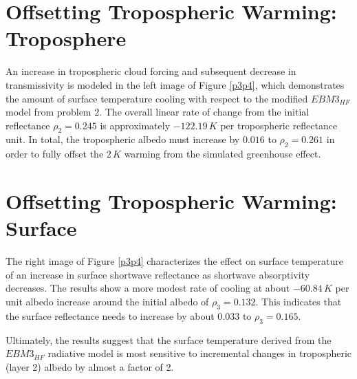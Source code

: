 \documentclass[12pt]{article}
\begin{document}
\section{Offsetting Tropospheric Warming: Troposphere}

An increase in tropospheric cloud forcing and subsequent decrease in transmissivity is modeled in the left image of Figure \ref{p3p4}, which demonstrates the amount of surface temperature cooling with respect to the modified $EBM3_{HF}$ model from problem 2. The overall linear rate of change from the initial reflectance $\rho_2=0.245$ is approximately $-122.19\,\si{K}$ per tropospheric reflectance unit. In total, the tropospheric albedo must increase by $0.016$ to $\rho_2 = 0.261$ in order to fully offset the $2\,\si{K}$ warming from the simulated greenhouse effect.

\section{Offsetting Tropospheric Warming: Surface}

The right image of Figure \ref{p3p4} characterizes the effect on surface temperature of an increase in surface shortwave reflectance as shortwave absorptivity decreases. The results show a more modest rate of cooling at about $-60.84\,\si{K}$ per unit albedo increase around the initial albedo of $\rho_3 = 0.132$. This indicates that the surface reflectance needs to increase by about $0.033$ to $\rho_3 = 0.165$.

Ultimately, the results suggest that the surface temperature derived from the $EBM3_{HF}$ radiative model is most sensitive to incremental changes in tropospheric (layer 2) albedo by almost a factor of 2.
\end{document}
